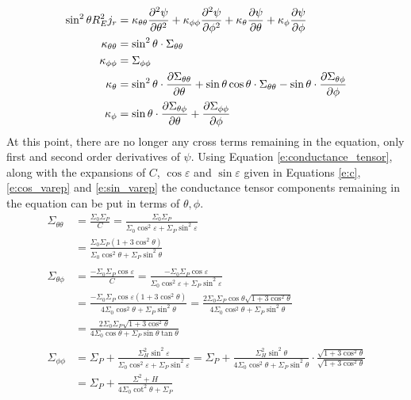 \documentclass{article}
\begin{document}
\begin{equation}
	\begin{aligned}
        \label{e:coeff_form}
		\sin^2\theta R_E^2 j_r & = \kappa_{\theta\theta}\pdv[2]{\psi}{\theta} +
		\kappa_{\phi\phi} \pdv[2]{\psi}{\phi} +
		\kappa_{\theta} \pdv{\psi}{\theta} +
		\kappa_{\phi} \pdv{\psi}{\phi}                                                \\
		\kappa_{\theta\theta}  & = \sin^2 \theta \cdot  \Sigma_{\theta\theta}         \\
		\kappa_{\phi\phi}      & = \Sigma_{\phi\phi}                                  \\
		\kappa_{\theta}        & =
		\sin^2\theta\cdot \pdv{\Sigma_{\theta\theta}}{\theta}
		+ \sin \theta\cos\theta\cdot \Sigma_{\theta\theta}
		- \sin\theta\cdot\pdv{\Sigma_{\theta\phi}}{\phi}                              \\
		\kappa_{\phi}          & = \sin\theta\cdot\pdv{\Sigma_{\theta\phi}}{\theta} +
		\pdv{\Sigma_{\phi\phi}}{\phi}
	\end{aligned}
\end{equation}
At this point, there are no longer any cross terms remaining in the equation, only first and second order derivatives of $\psi$. Using Equation \ref{e:conductance_tensor}, along with the expansions of $C$, $\cos\varepsilon$ and $\sin\varepsilon$ given in Equations \ref{e:c}, \ref{e:cos_varep} and \ref{e:sin_varep} the conductance tensor components remaining in the equation can be put in terms of $\theta,\phi$. 
\begin{align*}
    \Sigma_{\theta\theta} 
        &= \frac{\Sigma_0\Sigma_P}{C}
        = \frac{\Sigma_0\Sigma_P}{\Sigma_0\cos^2 \varepsilon + \Sigma_P\sin^2\varepsilon}\\
        &= \frac{\Sigma_0\Sigma_P(1+3\cos^2\theta)}{\Sigma_0\cos^2 \theta+ \Sigma_P\sin^2\theta}\\\\
    \Sigma_{\theta\phi} 
        &= \frac{-\Sigma_0\Sigma_P\cos\varepsilon}{C}
        =\frac{-\Sigma_0\Sigma_P\cos\varepsilon}{\Sigma_0\cos^2 \varepsilon + \Sigma_P\sin^2\varepsilon}\\
        &= \frac{-\Sigma_0\Sigma_P\cos\varepsilon(1+3\cos^2\theta)}{4\Sigma_0\cos^2 \theta+ \Sigma_P\sin^2\theta}
        = \frac{2\Sigma_0\Sigma_P\cos\theta\sqrt{1+3\cos^2\theta}}{4\Sigma_0\cos^2 \theta+ \Sigma_P\sin^2\theta}\\
        &= \frac{2\Sigma_0\Sigma_P\sqrt{1+3\cos^2\theta}}{4\Sigma_0\cos \theta+ \Sigma_P\sin\theta\tan\theta}\\\\
    \Sigma_{\phi\phi} 
        &=  \Sigma_P + \frac{\Sigma_H^2\sin^2\varepsilon}{\Sigma_0\cos^2\varepsilon + \Sigma_P\sin^2\varepsilon} 
        = \Sigma_P + \frac{\Sigma_H^2\sin^2\theta}{4\Sigma_0\cos^2\theta+ \Sigma_P\sin^2\theta} \cdot \frac{\sqrt{1+3\cos^2\theta}}{\sqrt{1+3\cos^2\theta}}\\
        &= \Sigma_P + \frac{\Sigma^2+H}{4\Sigma_0\cot^2\theta + \Sigma_P}
\end{align*}
\end{document}
